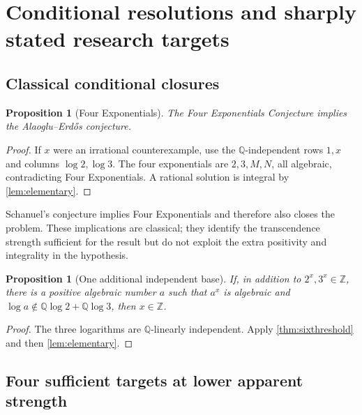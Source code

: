 \documentclass[11pt,oneside]{article}
\newtheorem{proposition}[theorem]{Proposition}
\theoremstyle{definition}
\newcommand{\Q}{\mathbb{Q}}
\newcommand{\Z}{\mathbb{Z}}
\begin{document}
\section{Conditional resolutions and sharply stated research targets}

\subsection{Classical conditional closures}

\begin{proposition}[Four Exponentials]\label{prop:fourconditional}
The Four Exponentials Conjecture implies the Alaoglu--Erd\H{o}s conjecture.
\end{proposition}

\begin{proof}
If $x$ were an irrational counterexample, use the $\Q$-independent rows
$1,x$ and columns $\log2,\log3$.  The four exponentials are
$2,3,M,N$, all algebraic, contradicting Four Exponentials.  A rational solution is integral by \cref{lem:elementary}.
\end{proof}

Schanuel's conjecture implies Four Exponentials and therefore also closes the problem.  These implications are classical; they identify the transcendence strength sufficient for the result but do not exploit the extra positivity and integrality in the hypothesis.

\begin{proposition}[One additional independent base]\label{prop:thirdbaseconditional}
If, in addition to $2^x,3^x\in\Z$, there is a positive algebraic number $a$ such that $a^x$ is algebraic and
$\log a\notin\Q\log2+\Q\log3$, then $x\in\Z$.
\end{proposition}

\begin{proof}
The three logarithms are $\Q$-linearly independent.  Apply
\cref{thm:sixthreshold} and then \cref{lem:elementary}.
\end{proof}

\subsection{Four sufficient targets at lower apparent strength}
\end{document}
